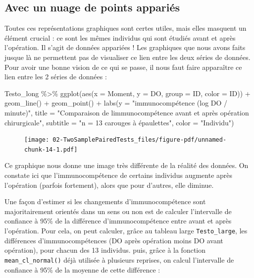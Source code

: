 \documentclass[
  a4paper,
  DIV=11,
  numbers=noendperiod,
  oneside]{scrreprt}
\newenvironment{Shaded}{}{}
\newcommand{\AttributeTok}[1]{\textcolor[rgb]{0.84,0.23,0.29}{#1}}
\newcommand{\FunctionTok}[1]{\textcolor[rgb]{0.44,0.26,0.76}{#1}}
\newcommand{\NormalTok}[1]{\textcolor[rgb]{0.14,0.16,0.18}{#1}}
\newcommand{\SpecialCharTok}[1]{\textcolor[rgb]{0.00,0.36,0.77}{#1}}
\newcommand{\StringTok}[1]{\textcolor[rgb]{0.01,0.18,0.38}{#1}}
\begin{document}
\hypertarget{avec-un-nuage-de-points-appariuxe9s}{%
\subsection{Avec un nuage de points
appariés}\label{avec-un-nuage-de-points-appariuxe9s}}

Toutes ces représentations graphiques sont certes utiles, mais elles
masquent un élément crucial : ce sont les mêmes individus qui sont
étudiés avant et après l'opération. Il s'agit de données appariées ! Les
graphiques que nous avons faits jusque là ne permettent pas de
visualiser ce lien entre les deux séries de données. Pour avoir une
bonne vision de ce qui se passe, il nous faut faire apparaître ce lien
entre les 2 séries de données :

\begin{Shaded}
\begin{Highlighting}[]
\NormalTok{Testo\_long }\SpecialCharTok{\%\textgreater{}\%}
  \FunctionTok{ggplot}\NormalTok{(}\FunctionTok{aes}\NormalTok{(}\AttributeTok{x =}\NormalTok{ Moment, }\AttributeTok{y =}\NormalTok{ DO, }\AttributeTok{group =}\NormalTok{ ID, }\AttributeTok{color =}\NormalTok{ ID)) }\SpecialCharTok{+}
  \FunctionTok{geom\_line}\NormalTok{() }\SpecialCharTok{+}
  \FunctionTok{geom\_point}\NormalTok{() }\SpecialCharTok{+}
  \FunctionTok{labs}\NormalTok{(}\AttributeTok{y =} \StringTok{"immunocompétence (log DO / minute)"}\NormalTok{,}
       \AttributeTok{title =} \StringTok{"Comparaison de l\textquotesingle{}immunocompétence avant et après opération chirurgicale"}\NormalTok{,}
       \AttributeTok{subtitle =} \StringTok{"n = 13 carouges à épaulettes"}\NormalTok{, }
       \AttributeTok{color =} \StringTok{"Individu"}\NormalTok{)}
\end{Highlighting}
\end{Shaded}

\begin{figure}[H]

{\centering \texttt{[image: 02-TwoSamplePairedTests\_files/figure-pdf/unnamed-chunk-14-1.pdf]}

}

\end{figure}

Ce graphique nous donne une image très différente de la réalité des
données. On constate ici que l'immunocompétence de certains individus
augmente après l'opération (parfois fortement), alors que pour d'autres,
elle diminue.

Une façon d'estimer si les changements d'immunocompétence sont
majoritairement orientés dans un sens ou non est de calculer
l'intervalle de confiance à 95\% de la différence d'immunocompétence
entre avant et après l'opération. Pour cela, on peut calculer, grâce au
tableau large \texttt{Testo\_large}, les différences d'immunocompétences
(DO après opération moins DO avant opération), pour chacun des 13
individus. puis, grâce à la fonction \texttt{mean\_cl\_normal()} déjà
utilisée à plusieurs reprises, on calcul l'intervalle de confiance à
95\% de la moyenne de cette différence :
\end{document}
